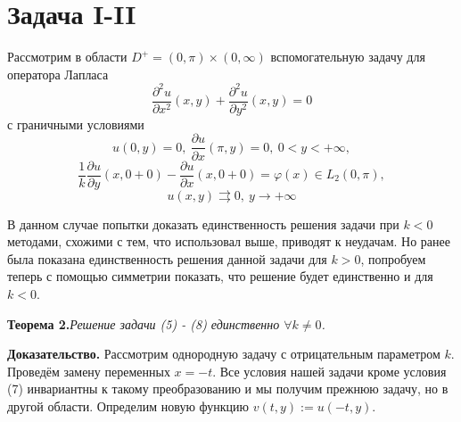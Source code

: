 \documentclass[9pt]{article}
\begin{document}
	
	\section{Задача I-II}
		Рассмотрим в области $D^{+} = (0, \pi) \times (0, \infty)$ вспомогательную задачу для оператора Лапласа 
	\begin{equation}
		\dfrac{\partial^2 u}{\partial x^2}(x,y) + \dfrac{\partial^2 u}{\partial y^2}(x,y) = 0
	\end{equation}
	с граничными условиями 
	\begin{equation}
		u(0,y) = 0, \ \dfrac{\partial u}{\partial x}(\pi, y) = 0, \ 0 < y < +\infty, 
	\end{equation}
	\begin{equation}
		\dfrac{1}{k} \dfrac{\partial u}{\partial y}(x,0+0) - \dfrac{\partial u}{\partial x}(x,0+0) = \varphi(x) \in L_2(0,\pi),
	\end{equation}
	\begin{equation}
		u(x,y) \rightrightarrows 0, \ y \to +\infty 
	\end{equation}
	
	В данном случае попытки доказать единственность решения задачи при $k < 0$ методами, схожими с тем, что использовал выше, приводят к неудачам. Но ранее была показана единственность решения данной задачи для $k > 0$, попробуем теперь с помощью симметрии показать, что решение будет единственно и для $ k < 0$.
	
		\textbf{Теорема 2.}\textit{Решение задачи (5) - (8) единственно $\forall k \neq 0$.}
		
		
	\textbf{Доказательство.} \newline
	Рассмотрим однородную задачу с отрицательным параметром $k$. 
	Проведём замену переменных $x = -t$. Все условия нашей задачи кроме условия (7) инвариантны к такому преобразованию и мы получим прежнюю задачу, но в другой области.  Определим новую функцию $v(t,y) := u(-t, y)$.
	
\end{document}
